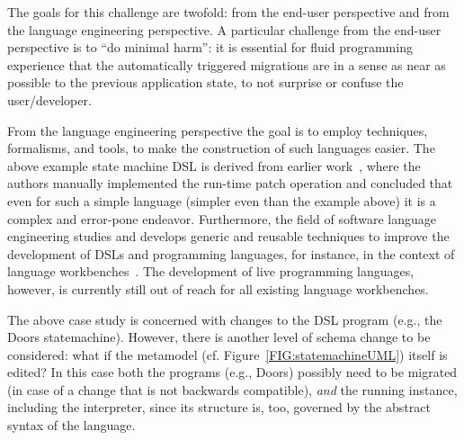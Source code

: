 \documentclass[english,submission]{programming}
\begin{document}
The goals for this challenge are twofold: from the end-user perspective and from the language engineering perspective. A particular challenge from the end-user perspective is to ``do minimal harm'': it is essential for fluid programming experience that the automatically triggered migrations are in a sense as near as possible to the previous application state, to not surprise or confuse the user/developer.

From the language engineering perspective the goal is to employ techniques, formalisms, and tools, to make the construction of such languages easier. The above example state machine DSL is derived from earlier work~\cite{vanRozen19}, where the authors manually implemented the run-time patch operation and concluded that even for such a simple language (simpler even than the example above) it is a complex and error-pone endeavor. Furthermore, the field of software language engineering studies and develops generic and reusable techniques to improve the development of DSLs and programming languages, for instance, in the context of language workbenches~\cite{ERDWEG201524}. The development of live programming languages, however, is currently still out of reach for all existing language workbenches. 

The above case study is concerned with changes to the DSL program (e.g., the Doors statemachine). However, there is another level of schema change to be considered: what if the metamodel (cf. Figure~\ref{FIG:statemachineUML}) itself is edited? In this case both the programs (e.g., Doors) possibly need to be migrated (in case of a change that is not backwards compatible), \textit{and} the running instance, including the interpreter, since its structure is, too, governed by the abstract syntax of the language. 

\end{document}
